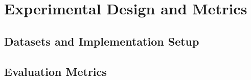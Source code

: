 \section{Experimental Design and Metrics}
\subsection{Datasets and Implementation Setup}
\subsection{Evaluation Metrics}
